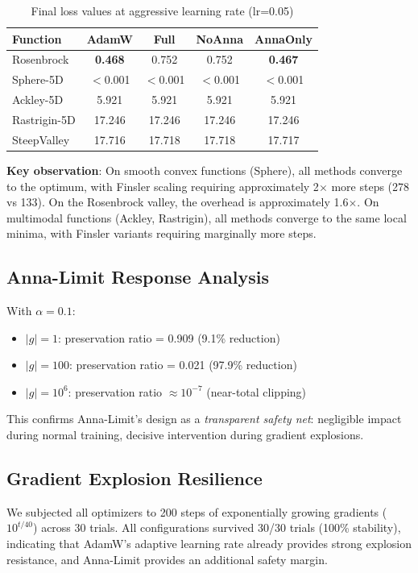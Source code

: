 \documentclass[11pt,a4paper,twocolumn]{article}
\begin{document}
\begin{table}[h]
\centering
\caption{Final loss values at aggressive learning rate (lr=0.05)}
\label{tab:convergence}
\small
\begin{tabular}{@{}lcccc@{}}
\toprule
Function & AdamW & Full & NoAnna & AnnaOnly \\
\midrule
Rosenbrock & \textbf{0.468} & 0.752 & 0.752 & \textbf{0.467} \\
Sphere-5D & $<$0.001 & $<$0.001 & $<$0.001 & $<$0.001 \\
Ackley-5D & 5.921 & 5.921 & 5.921 & 5.921 \\
Rastrigin-5D & 17.246 & 17.246 & 17.246 & 17.246 \\
SteepValley & 17.716 & 17.718 & 17.718 & 17.717 \\
\bottomrule
\end{tabular}
\end{table}

\textbf{Key observation}: On smooth convex functions (Sphere), all methods converge to the optimum, with Finsler scaling requiring approximately 2$\times$ more steps (278 vs 133). On the Rosenbrock valley, the overhead is approximately 1.6$\times$. On multimodal functions (Ackley, Rastrigin), all methods converge to the same local minima, with Finsler variants requiring marginally more steps.

\subsection{Anna-Limit Response Analysis}

With $\alpha = 0.1$:
\begin{itemize}
  \item $|g| = 1$: preservation ratio = 0.909 (9.1\% reduction)
  \item $|g| = 100$: preservation ratio = 0.021 (97.9\% reduction)
  \item $|g| = 10^6$: preservation ratio $\approx 10^{-7}$ (near-total clipping)
\end{itemize}

This confirms Anna-Limit's design as a \emph{transparent safety net}: negligible impact during normal training, decisive intervention during gradient explosions.

\subsection{Gradient Explosion Resilience}

We subjected all optimizers to 200 steps of exponentially growing gradients ($10^{t/40}$) across 30 trials. All configurations survived 30/30 trials (100\% stability), indicating that AdamW's adaptive learning rate already provides strong explosion resistance, and Anna-Limit provides an additional safety margin.
\end{document}
